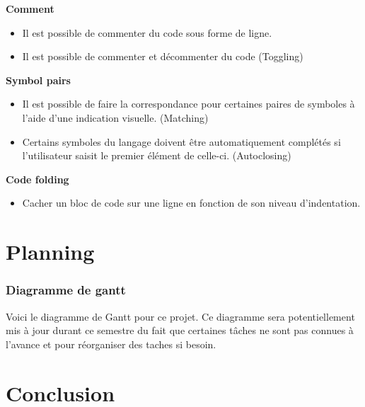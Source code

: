 \documentclass[
    iict, %
    il, %
]{heig-tb}
\begin{document}

\textbf{Comment}
\begin{itemize}
    \item Il est possible de commenter du code sous forme de ligne.
    \item Il est possible de commenter et décommenter du code (Toggling)
\end{itemize}

\textbf{Symbol pairs}
\begin{itemize}
    \item Il est possible de faire la correspondance pour certaines paires de symboles à l'aide d'une indication visuelle. (Matching)
    \item Certains symboles du langage doivent être automatiquement complétés si l'utilisateur saisit le premier élément de celle-ci. (Autoclosing)
\end{itemize}

\textbf{Code folding}
\begin{itemize}
    \item Cacher un bloc de code sur une ligne en fonction de son niveau d'indentation.
\end{itemize}


\chapter{Planning}


\subsection{Diagramme de gantt}
Voici le diagramme de Gantt pour ce projet.
Ce diagramme sera potentiellement mis à jour durant ce semestre du fait que certaines tâches ne sont pas connues à l'avance et pour réorganiser des taches si besoin.




\chapter{Conclusion}
\end{document}
